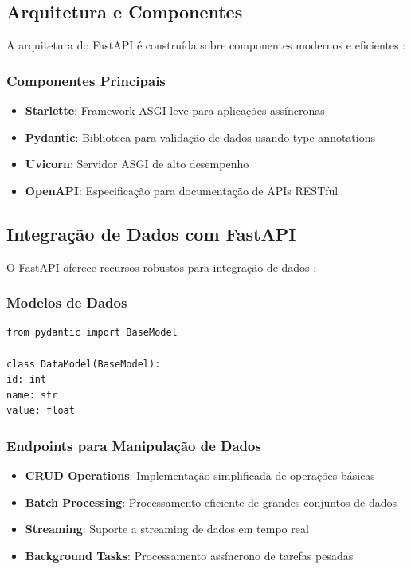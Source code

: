 \subsection{Arquitetura e Componentes}

A arquitetura do FastAPI é construída sobre componentes modernos e eficientes \cite{kumar2023modern}:

\subsubsection{Componentes Principais}
\begin{itemize}
\item \textbf{Starlette}: Framework ASGI leve para aplicações assíncronas
\item \textbf{Pydantic}: Biblioteca para validação de dados usando type annotations
\item \textbf{Uvicorn}: Servidor ASGI de alto desempenho
\item \textbf{OpenAPI}: Especificação para documentação de APIs RESTful
\end{itemize}

\subsection{Integração de Dados com FastAPI}

O FastAPI oferece recursos robustos para integração de dados \cite{wilson2023data}:

\subsubsection{Modelos de Dados}
\begin{verbatim}
from pydantic import BaseModel

class DataModel(BaseModel):
id: int
name: str
value: float
\end{verbatim}

\subsubsection{Endpoints para Manipulação de Dados}
\begin{itemize}
\item \textbf{CRUD Operations}: Implementação simplificada de operações básicas
\item \textbf{Batch Processing}: Processamento eficiente de grandes conjuntos de dados
\item \textbf{Streaming}: Suporte a streaming de dados em tempo real
\item \textbf{Background Tasks}: Processamento assíncrono de tarefas pesadas
\end{itemize}

